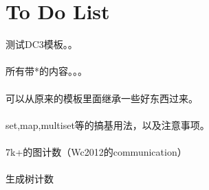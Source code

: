 \section{To Do List}
    测试DC3模板。。\\
    \\
    所有带*的内容。。。\\
    \\
    可以从原来的模板里面继承一些好东西过来。\\
    \\
    set,map,multiset等的搞基用法，以及注意事项。\\
    \\
    7k+的图计数（Wc2012的communication）\\
    \\
    生成树计数\\